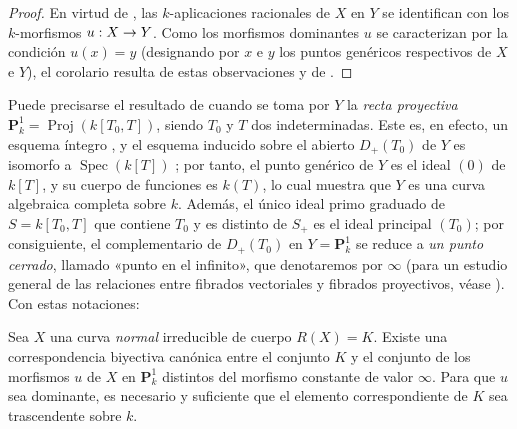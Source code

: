 \documentclass[oneside,10pt]{amsart}
\makeatletter
\newcommand{\ega@arrow}[2]{\mathchoice{#1}{#2}{#2}{#2}}
\renewcommand{\to}{\ega@arrow{\longrightarrow}{\rightarrow}}
\let\EGAOriginalLabel\label
\renewcommand{\label}[1]{\phantomsection\EGAOriginalLabel{#1}}
\makeatother
\begin{document}
\begin{proof}
En virtud de , las $k$-aplicaciones racionales de $X$ en $Y$ se identifican con los $k$-morfismos $u:X\to Y$.
Como los morfismos dominantes $u$ se caracterizan por la condición $u(x)=y$ (designando por $x$ e $y$ los puntos genéricos respectivos de $X$ e $Y$), el corolario resulta de estas observaciones y de .
\end{proof}

\begin{env}[7.4.14]
\label{II.7.4.14-fr}
Puede precisarse el resultado de  cuando se toma por $Y$ la \emph{recta proyectiva} $\mathbf{P}_k^1=\operatorname{Proj}(k[T_0,T])$, siendo $T_0$ y $T$ dos indeterminadas.
Este es, en efecto, un esquema íntegro , y el esquema inducido sobre el abierto $D_+(T_0)$ de $Y$ es isomorfo a $\operatorname{Spec}(k[T])$ ; por tanto, el punto genérico de $Y$ es el ideal $(0)$ de $k[T]$, y su cuerpo de funciones es $k(T)$, lo cual muestra que $Y$ es una curva algebraica completa sobre $k$.
Además, el único ideal primo graduado de $S=k[T_0,T]$ que contiene $T_0$ y es distinto de $S_+$ es el ideal principal $(T_0)$; por consiguiente, el complementario de $D_+(T_0)$ en $Y=\mathbf{P}_k^1$ se reduce a \emph{un punto cerrado}, llamado «punto en el infinito», que denotaremos por $\infty$ (para un estudio general de las relaciones entre fibrados vectoriales y fibrados proyectivos, véase ).
Con estas notaciones:
\end{env}

\begin{corollary}[7.4.15]
\label{II.7.4.15-fr}
Sea $X$ una curva \emph{normal} irreducible de cuerpo $R(X)=K$.
Existe una correspondencia biyectiva canónica entre el conjunto $K$ y el conjunto de los morfismos $u$ de $X$ en $\mathbf{P}_k^1$ distintos del morfismo constante de valor $\infty$.
Para que $u$ sea dominante, es necesario y suficiente que el elemento correspondiente de $K$ sea trascendente sobre $k$.
\end{corollary}
\end{document}
